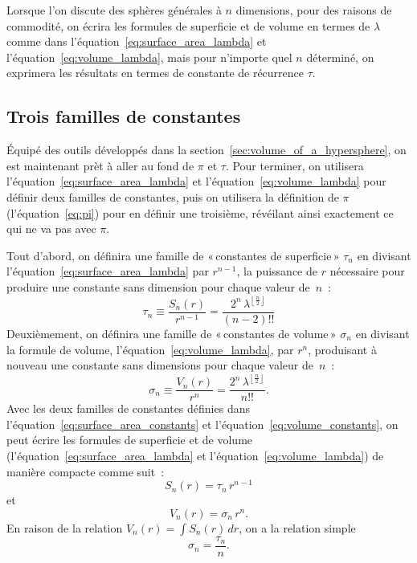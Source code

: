 Lorsque l'on discute des sphères générales à $n$ dimensions, pour des raisons de commodité, on écrira les formules de superficie et de volume en termes de $\lambda$ comme dans l'équation~\eqref{eq:surface_area_lambda} et l'équation~\eqref{eq:volume_lambda}, mais pour n'importe quel $n$ déterminé, on exprimera les résultats en termes de constante de récurrence $\tau$.




  \subsection{Trois familles de constantes} %
  \label{sec:three_families_of_constants}

Équipé des outils développés dans la section~\ref{sec:volume_of_a_hypersphere}, on est maintenant prèt à aller au fond de $\pi$ et $\tau$. Pour terminer, on utilisera l'équation~\eqref{eq:surface_area_lambda} et l'équation~\eqref{eq:volume_lambda} pour définir deux familles de constantes, puis on utilisera la définition de $\pi$ (l'équation~\eqref{eq:pi}) pour en définir une troisième, révéilant ainsi exactement ce qui ne va pas avec $\pi$.

Tout d'abord, on définira une famille de «\,constantes de superficie\,» $\tau_n$ en divisant \linebreak l'équation~\eqref{eq:surface_area_lambda} par $r^{n-1}$, la puissance de $r$ nécessaire pour produire une constante sans dimension pour chaque valeur de~$n$~:
\begin{equation}
\label{eq:surface_area_constants}
\tau_n \equiv \frac{S_n(r)}{r^{n-1}} = \frac{2^n\,\lambda^{\left\lfloor \frac{n}{2} \right\rfloor}}{(n-2)!!}
\end{equation}
Deuxièmement, on définira une famille de «\,constantes de volume\,» $\sigma_n$ en divisant la formule de volume, l'équation~\eqref{eq:volume_lambda}, par $r^n$, produisant à nouveau une constante sans dimensions pour chaque valeur de~$n$~:
\begin{equation}
\label{eq:volume_constants}
\sigma_n \equiv \frac{V_n(r)}{r^n} = \frac{2^n\,\lambda^{\left\lfloor \frac{n}{2} \right\rfloor}}{n!!}.
\end{equation}
Avec les deux familles de constantes définies dans l'équation~\eqref{eq:surface_area_constants} et l'équation~\eqref{eq:volume_constants}, on peut écrire les formules de superficie et de volume (l'équation~\eqref{eq:surface_area_lambda} et l'équation~\eqref{eq:volume_lambda}) de manière compacte comme suit~:
\[ S_n(r) = \tau_n\,r^{n-1} \]
et
\[ V_n(r) = \sigma_n\,r^n. \]
En raison de la relation $V_n(r) = \int S_n(r)\,dr$, on a la relation simple
\[
\sigma_n = \frac{\tau_n}{n}.
\]

